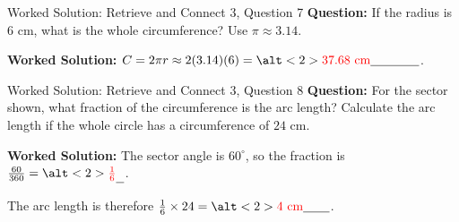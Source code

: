 \documentclass{beamer}
\newcommand{\ablank}[1]{%
  \alt<2>{\textcolor{red}{#1}}{\underline{\phantom{#1}}}%
}
\begin{document}
\begin{frame}{Worked Solution: Retrieve and Connect 3, Question 7}
\small
\textbf{Question:} If the radius is \(6\) cm, what is the whole circumference? Use \(\pi\approx3.14\).

\textbf{Worked Solution:} \(C=2\pi r\approx2(3.14)(6)=\ablank{37.68\text{ cm}}\).
\end{frame}

\begin{frame}{Worked Solution: Retrieve and Connect 3, Question 8}
\small
\textbf{Question:} For the sector shown, what fraction of the circumference is the arc length? Calculate the arc length if the whole circle has a circumference of \(24\) cm.

\textbf{Worked Solution:} The sector angle is \(60^\circ\), so the fraction is
\(\frac{60}{360}=\ablank{\frac16}\).

The arc length is therefore
\(\frac16\times24=\ablank{4\text{ cm}}\).
\end{frame}
\end{document}
